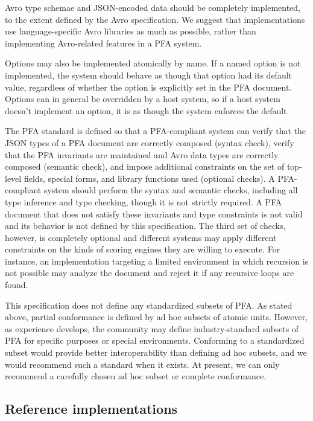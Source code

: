 \documentclass{article}
\theoremstyle{definition}
\begin{document}
Avro type schemae and JSON-encoded data should be completely implemented, to the extent defined by the Avro specification.  We suggest that implementations use language-specific Avro libraries as much as possible, rather than implementing Avro-related features in a PFA system.

Options may also be implemented atomically by name.  If a named option is not implemented, the system should behave as though that option had its default value, regardless of whether the option is explicitly set in the PFA document.  Options can in general be overridden by a host system, so if a host system doesn't implement an option, it is as though the system enforces the default.

The PFA standard is defined so that a PFA-compliant system can verify that the JSON types of a PFA document are correctly composed (syntax check), verify that the PFA invariants are maintained and Avro data types are correctly composed (semantic check), and impose additional constraints on the set of top-level fields, special forms, and library functions used (optional checks).  A PFA-compliant system should perform the syntax and semantic checks, including all type inference and type checking, though it is not strictly required.  A PFA document that does not satisfy these invariants and type constraints is not valid and its behavior is not defined by this specification.  The third set of checks, however, is completely optional and different systems may apply different constraints on the kinds of scoring engines they are willing to execute.  For instance, an implementation targeting a limited environment in which recursion is not possible may analyze the document and reject it if any recursive loops are found.

This specification does not define any standardized subsets of PFA.  As stated above, partial conformance is defined by ad hoc subsets of atomic units.  However, as experience develops, the community may define industry-standard subsets of PFA for specific purposes or special environments.  Conforming to a standardized subset would provide better interoperability than defining ad hoc subsets, and we would recommend such a standard when it exists.  At present, we can only recommend a carefully chosen ad hoc subset or complete conformance.

\subsection{Reference implementations}
\end{document}
